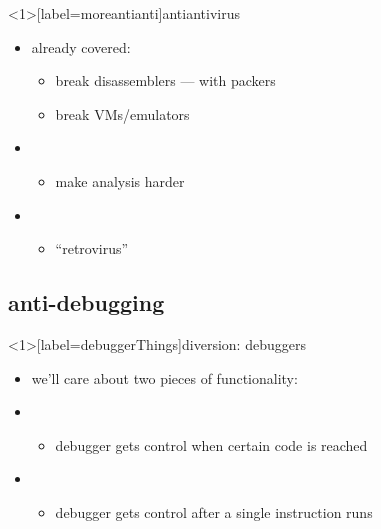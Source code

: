 \begin{frame}<1>[label=moreantianti]{antiantivirus} 
    \begin{itemize}
    \item already covered:
        \begin{itemize}
        \item break disassemblers --- with packers
        \item break VMs/emulators
        \end{itemize}
    \item {}
        \begin{itemize}
        \item make analysis harder
        \end{itemize}
    \item {}
        \begin{itemize}
        \item ``retrovirus''
        \end{itemize}
    \end{itemize}
\end{frame}


\subsection{anti-debugging}

\begin{frame}<1>[label=debuggerThings]{diversion: debuggers}
    \begin{itemize}
    \item we'll care about two pieces of functionality:
    \vspace{.5cm}
    \item {}
        \begin{itemize}
        \item debugger gets control when certain code is reached
        \end{itemize}
    \item {}
        \begin{itemize}
        \item debugger gets control after a single instruction runs
        \end{itemize}
    \end{itemize}
\end{frame}


